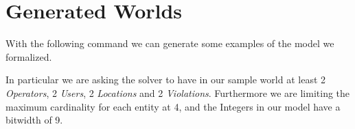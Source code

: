 \section{Generated Worlds}
With the following command we can generate some examples of the model we 
formalized.

In particular we are asking the solver to have in our sample world at least 2
\emph{Operators}, 2 \emph{Users}, 2 \emph{Locations} and 2 \emph{Violations}.
Furthermore we are limiting the maximum cardinality for each entity at 4, and
the Integers in our model have a bitwidth of 9.